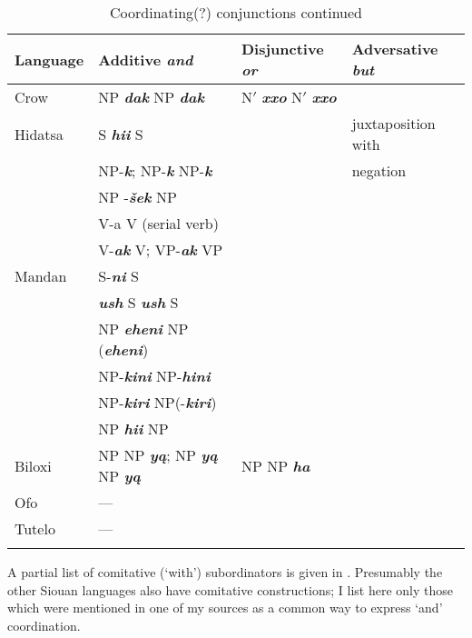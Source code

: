 \documentclass[output=paper]{LSP/langsci}
\begin{document}
\begin{table}
\caption{Coordinating(?) conjunctions continued} \label{morecoord}
\small
\begin{tabular}{ l  l  l  l  }
\lsptoprule
Language & Additive \textbf{\textit{and}} & Disjunctive \textbf{\textit{or}} & Adversative \textbf{\textit{but}} \\
\midrule  \vspace{1em}
Crow & NP \textbf{\textit{dak}} NP \textbf{\textit{dak}} & N$'$ \textbf{\textit{xxo}} N$'$ \textbf{\textit{xxo}} &  \\

Hidatsa & S \textbf{\textit{hii}} S &   & juxtaposition with  \\
& NP-\textbf{\textit{k}}; NP-\textbf{\textit{k}} NP-\textbf{\textit{k}} & & negation \\
& NP -\textbf{\textit{\v{s}ek}} NP & & \\
& V-a V (serial verb) & & \\ \vspace{1em}
& V-\textbf{\textit{ak}} V; VP-\textbf{\textit{ak}} VP & & \\

Mandan & S-\textbf{\textit{ni}} S &   & \\
& \textbf{\textit{ush}} S \textbf{\textit{ush}} S & & \\
& NP \textbf{\textit{eheni}} NP (\textbf{\textit{eheni}}) & & \\
& NP-\textbf{\textit{kini}} NP-\textbf{\textit{hini}} & & \\
& NP-\textbf{\textit{kiri}} NP(-\textbf{\textit{kiri}}) & & \\ \vspace{1em}
& NP \textbf{\textit{hii}} NP & & \\
 \vspace{1em}
Biloxi & NP NP \textbf{\textit{y\k{a}}}; NP \textbf{\textit{y\k{a}}} NP \textbf{\textit{y\k{a}}} & NP NP \textbf{\textit{ha}} & \\
 \vspace{1em}
Ofo	 & --- & & \\

Tutelo & ---  & & \\
\lspbottomrule
\end{tabular}  
\end{table}

A partial list of comitative (`with') subordinators is given in .  Presumably the other Siouan languages also have comitative constructions; I list here only those which were mentioned in one of my sources as a common way to express `and' coordination.
 
\end{document}
